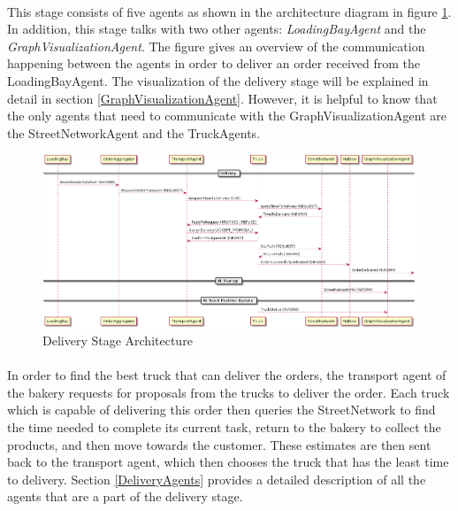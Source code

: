 \documentclass[11pt, a4paper]{article}
\begin{document}
\paragraph{}
This stage consists of five agents as shown in the architecture diagram in figure \ref{DeliveryArchitecture}. In addition, this stage talks with two other agents: \textit{LoadingBayAgent} and the \textit{GraphVisualizationAgent}. The figure gives an overview of the communication happening between the agents in order to deliver an order received from the LoadingBayAgent. The visualization of the delivery stage will be explained in detail in section \ref{GraphVisualizationAgent}. However, it is helpful to know that the only agents that need to communicate with the GraphVisualizationAgent are the StreetNetworkAgent and the TruckAgents. 

\begin{figure}[h!]
	\centering
	\includegraphics[width=\textwidth]{../Architecture/Architecture_Delivery.png}
	\caption{Delivery Stage Architecture}
	\label{DeliveryArchitecture}
\end{figure}

\paragraph{}
In order to find the best truck that can deliver the orders, the transport agent of the bakery requests for proposals from the trucks to deliver the order. Each truck which is capable of delivering this order then queries the StreetNetwork to find the time needed to complete its current task, return to the bakery to collect the products, and then move towards the customer. These estimates are then sent back to the transport agent, which then chooses the truck that has the least time to delivery.  Section \ref{DeliveryAgents} provides a detailed description of all the agents that are a part of the delivery stage.
\end{document}
